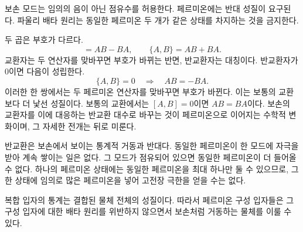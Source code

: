 보손 모드는 임의의 음이 아닌 점유수를 허용한다. 페르미온에는 반대 성질이 요구된다. 파울리 배타 원리는 동일한 페르미온 두 개가 같은 상태를 차지하는 것을 금지한다.

\begin{classroomqa}\end{classroomqa}

두 곱은 부호가 다르다.
\begin{equation}
[A,B]=AB-BA,
\qquad
\{A,B\}=AB+BA.
\end{equation}
교환자는 두 연산자를 맞바꾸면 부호가 바뀌는 반면, 반교환자는 대칭이다. 반교환자가 0이면 다음이 성립한다.
\begin{equation}
\{A,B\}=0
\quad\Longrightarrow\quad
AB=-BA.
\end{equation}
이러한 한 쌍에서는 두 페르미온 연산자를 맞바꾸면 부호가 바뀐다. 이는 보통의 교환보다 더 낯선 성질이다. 보통의 교환에서는 \([A,B]=0\)이면 \(AB=BA\)이다. 보손의 교환자를 이에 대응하는 반교환 대수로 바꾸는 것이 페르미온으로 이어지는 수학적 변화이며, 그 자세한 전개는 뒤로 미룬다.

반교환은 보손에서 보이는 통계적 거동과 반대다. 동일한 페르미온이 한 모드에 자극을 받아 계속 쌓이는 일은 없다. 그 모드가 점유되어 있으면 동일한 페르미온이 더 들어올 수 없다. 하나의 페르미온 상태에는 동일한 페르미온을 최대 하나만 둘 수 있으므로, 그 한 상태에 임의로 많은 페르미온을 넣어 고전장 극한을 얻을 수는 없다.

\begin{classroomqa}\end{classroomqa}

복합 입자의 통계는 결합된 물체 전체의 성질이다. 따라서 페르미온 구성 입자들은 그 구성 입자에 대한 배타 원리를 위반하지 않으면서 보손처럼 거동하는 물체를 이룰 수 있다.

\begin{classroomqa}\end{classroomqa}

